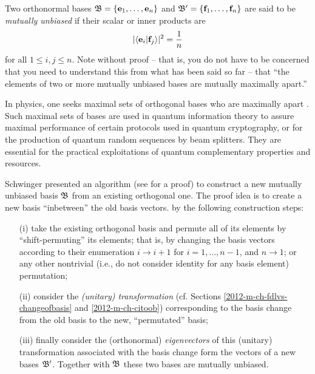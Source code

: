 Two  orthonormal bases
${\frak B} =\{
{\bf e}_1,
\ldots ,
{\bf e}_n
\}$
and
${\frak B}'=\{
{\bf f}_1,
\ldots ,
{\bf f}_n
\}$
are said to be {\em mutually unbiased}
if
their scalar or inner products are
\begin{equation}
\vert \langle {\bf e}_i\vert {\bf f}_j  \rangle \vert^2
=
\frac{1}{n}
\end{equation}
for all $1\le i,j\le n$.
Note without proof -- that is, you do not have to be concerned
that you need to understand  this from what has been said so far --
that ``the elements of two or more mutually unbiased bases are mutually maximally apart.''

{\color{Purple}
In physics, one seeks maximal sets of orthogonal bases who
are maximally apart \cite{WooFie,durt} .
Such maximal sets of bases are used in quantum information theory
to assure maximal performance of certain protocols
used in quantum cryptography, or for the production of
quantum random sequences by beam splitters.
They are essential for the practical exploitations of quantum complementary properties
and resources.
}



Schwinger presented an algorithm (see \cite{Schwinger.60} for a proof)
to construct a new mutually unbiased basis ${\frak B}$   from an existing orthogonal one.
The proof idea
is to create a new basis ``inbetween'' the old basis vectors.
by the following construction steps:
\begin{itemize}
\item[(i)]
take the existing orthogonal basis and permute all of its elements by ``shift-permuting'' its elements; that is, by
changing
the basis vectors according to their enumeration $i \rightarrow i+1$ for $i=1,\ldots , n-1$, and $n \rightarrow 1$;
or any other nontrivial (i.e., do not consider identity for any basis element) permutation;
\item[(ii)]
consider the {\em (unitary) transformation} (cf. Sections \ref{2012-m-ch-fdlvs-changeofbasis} and \ref{2012-m-ch-citoob})
corresponding to the basis change from the old basis to the new, ``permutated'' basis;
\item[(iii)]
finally consider the (orthonormal) {\em eigenvectors}    of this (unitary) transformation associated with the basis change
form the vectors of a new bases  ${\frak B}'$.
Together with ${\frak B}$ these two bases are mutually unbiased.
\end{itemize}

